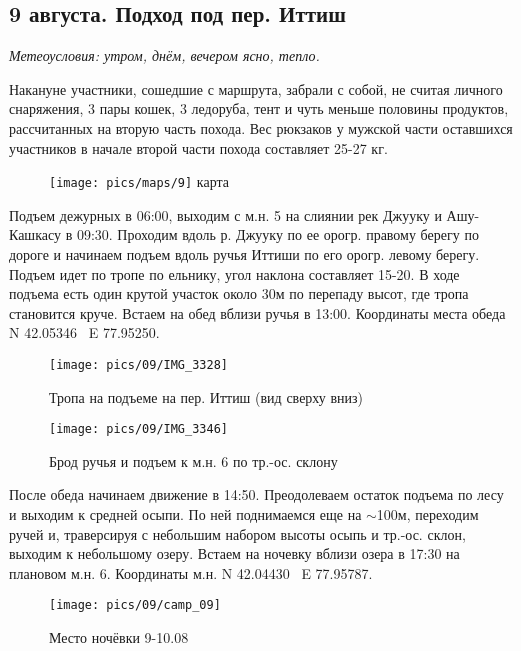 \subsection{9 августа. Подход под пер. Иттиш}
\textit{Метеоусловия: утром, днём, вечером ясно, тепло.}

Накануне участники, сошедшие с маршрута, забрали с собой, не считая личного снаряжения, 3 пары кошек, 3 ледоруба, тент и чуть меньше половины продуктов, рассчитанных на вторую часть похода. Вес рюкзаков у мужской части оставшихся участников в начале второй части похода составляет 25-27 кг.

\begin{figure}[h!]
	\centering
	\texttt{[image: pics/maps/9]}
	\alert{карта}
	\label{fig:mini_9}
\end{figure}

Подъем дежурных в 06:00, выходим с м.н. 5 на слиянии рек Джууку и Ашу-Кашкасу в 09:30. Проходим вдоль р. Джууку по ее орогр. правому берегу  по дороге и начинаем подъем вдоль ручья Иттиши по его орогр. левому берегу. Подъем идет по тропе по ельнику, угол наклона составляет 15-20\degree. В ходе подъема есть один крутой участок около 30м по перепаду высот, где тропа становится круче. Встаем на обед вблизи ручья в 13:00. Координаты места обеда N 42.05346\degree~ E 77.95250\degree.

\begin{figure}[h!]
	\centering
	\texttt{[image: pics/09/IMG\_3328]}
	\caption{Тропа на подъеме на пер. Иттиш (вид сверху вниз)}
	\label{fig:IMG_3328}
\end{figure}

\begin{figure}[h!]
	\centering
	\texttt{[image: pics/09/IMG\_3346]}
	\caption{Брод ручья и подъем к м.н. 6 по тр.-ос. склону}
	\label{fig:IMG_3346}
\end{figure}


После обеда начинаем движение в 14:50. Преодолеваем остаток подъема по лесу и выходим к средней осыпи. По ней поднимаемся еще на $\sim$100м, переходим ручей и, траверсируя с небольшим набором высоты осыпь и тр.-ос. склон, выходим к небольшому озеру. Встаем на ночевку вблизи озера в 17:30 на плановом м.н. 6. Координаты м.н. N 42.04430\degree~ E 77.95787\degree.


\begin{figure}[h!]
	\centering
	\texttt{[image: pics/09/camp\_09]} %
	\caption{Место ночёвки 9-10.08}
	\label{fig:camp_09}
\end{figure}

\clearpage